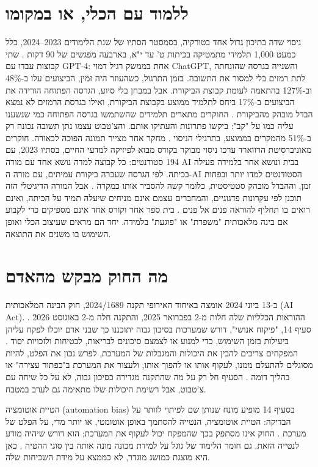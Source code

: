 \section{ללמוד עם הכלי, או במקומו}
ניסוי שדה בתיכון גדול אחד בטורקיה, בסמסטר הסתיו של שנת הלימודים 2023–2024, כלל כמעט 1,000 תלמידי מתמטיקה בכיתות ט' עד י"א, בארבעה מפגשים של 90 דקות \cite{S-ch07-10}. שתי קבוצות עבדו עם GPT-4: אחת בממשק רגיל דמוי ChatGPT, והשנייה בגרסה שהונחתה לתת רמזים בלי למסור את התשובה. בזמן התרגול, כשהעוזר היה זמין, הביצועים עלו ב-48\% וב-127\% בהתאמה לעומת קבוצת הביקורת. אבל במבחן בלי סיוע, הגרסה הפתוחה הורידה את הביצועים ב-17\% ביחס לתלמיד ממוצע בקבוצת הביקורת, ואילו בגרסת הרמזים לא נמצא הבדל מובהק מהביקורת \cite{S-ch07-10}. החוקרים מתארים תלמידים שהשתמשו בגרסה הפתוחה כמי שנשענו עליה כמו על "קב": ביקשו פתרונות והעתיקו אותם. והצ'טבוט עצמו נתן תשובה נכונה רק ב-51\% מהמקרים בממוצע, בתרגילי הניסוי \cite{S-ch07-10}.
מחקר אחר מצייר תמונה הפוכה לכאורה. חוקרים מאוניברסיטת הרווארד ערכו ניסוי מבוקר בקורס מבוא לפיזיקה למדעי החיים, בסתיו 2023, עם 194 סטודנטים: כל קבוצה למדה נושא אחד עם מורה AI בבית ונושא אחר בלמידה פעילה בכיתה. לפי הגרסה שעברה ביקורת עמיתים, עם מורה ה-AI הסטודנטים למדו יותר ובפחות זמן, וההבדל מובהק סטטיסטית, כלומר קשה להסביר אותו כמקרה \cite{S-ch07-13}. אבל המורה הדיגיטלי הזה תוכנן לפי עקרונות פדגוגיים, והמחברים עצמם אינם מניחים שיעלה תמיד על הכיתה, ואינם רואים בו תחליף להוראה פנים אל פנים \cite{S-ch07-13}.
בית ספר אחד וקורס אחד אינם מספיקים כדי לקבוע אם בינה מלאכותית "משפרת" או "פוגעת" בלמידה. יחד הם מראים שעיצוב הכלי ואופן השימוש בו משנים את התוצאה.
\section{מה החוק מבקש מהאדם}
ב-13 ביוני 2024 אומצה באיחוד האירופי תקנה 2024/1689, חוק הבינה המלאכותית (AI Act). ההוראות הכלליות שלה חלות מ-2 בפברואר 2025, והתקנה חלה מ-2 באוגוסט 2026 \cite{S-ch07-09}. סעיף 14, "פיקוח אנושי", דורש שמערכות בסיכון גבוה יתוכננו כך שבני אדם יוכלו לפקח עליהן ביעילות בזמן השימוש, כדי למנוע או לצמצם סיכונים לבריאות, לבטיחות ולזכויות יסוד \cite{S-ch07-08}. המפקחים צריכים להבין את היכולות והמגבלות של המערכת, לפרש נכון את הפלט, להיות מסוגלים להתעלם ממנו, לעקוף אותו או להפוך אותו, ולעצור את המערכת ב"כפתור עצירה" או בהליך דומה \cite{S-ch07-08}. הסעיף חל רק על מה שהתקנה מגדירה כסיכון גבוה, לא על כל שיחה עם צ'טבוט, אבל רשימת היכולות שלו מתאימה גם לערב במטבח.
\begin{conceptbox}{הטיית אוטומציה (automation bias)}
בסעיף 14 מופיע מונח שנותן שם לפיתוי לוותר על הבדיקה: הטיית אוטומציה, הנטייה להסתמך באופן אוטומטי, או יותר מדי, על הפלט של מערכת \cite{S-ch07-08}. החוק אינו מסתפק בכך שהמפקח יכול לעקוף את המערכת; הוא דורש שיהיה מודע לנטייה הזאת. גם חומר הלימוד של גוגל על למידת מכונה מונה אותה בין סוגי ההטיה \cite{S-ch02-14}. כאן היא מוצגת כמושג מוגדר, לא כממצא על מידת השכיחות שלה.
\end{conceptbox}

